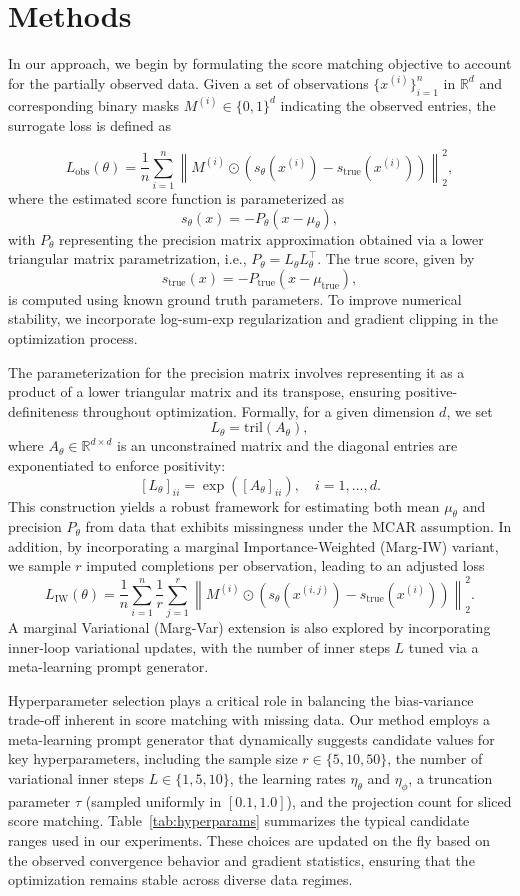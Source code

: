\documentclass{article} %
\begin{document}
\section{Methods}
In our approach, we begin by formulating the score matching objective to account for the partially observed data. Given a set of observations \( \{x^{(i)}\}_{i=1}^n \) in \( \mathbb{R}^d \) and corresponding binary masks \( M^{(i)} \in \{0,1\}^d \) indicating the observed entries, the surrogate loss is defined as

\[
L_{\mathrm{obs}}(\theta) = \frac{1}{n} \sum_{i=1}^n \left\| M^{(i)} \odot \left(s_\theta(x^{(i)}) - s_{\mathrm{true}}(x^{(i)})\right) \right\|_2^2,
\]
where the estimated score function is parameterized as 
\[
s_\theta(x) = -P_\theta (x - \mu_\theta),
\]
with \(P_\theta\) representing the precision matrix approximation obtained via a lower triangular matrix parametrization, i.e., \(P_\theta = L_\theta L_\theta^\top\). The true score, given by 
\[
s_{\mathrm{true}}(x) = -P_{\mathrm{true}} (x-\mu_{\mathrm{true}}),
\]
is computed using known ground truth parameters. To improve numerical stability, we incorporate log-sum-exp regularization and gradient clipping in the optimization process.

The parameterization for the precision matrix involves representing it as a product of a lower triangular matrix and its transpose, ensuring positive-definiteness throughout optimization. Formally, for a given dimension \(d\), we set 
\[
L_\theta = \mathrm{tril}(A_\theta),
\]
where \(A_\theta \in \mathbb{R}^{d \times d}\) is an unconstrained matrix and the diagonal entries are exponentiated to enforce positivity:
\[
[L_\theta]_{ii} = \exp\left( [A_\theta]_{ii} \right), \quad i=1,\ldots,d.
\]
This construction yields a robust framework for estimating both mean \(\mu_\theta\) and precision \(P_\theta\) from data that exhibits missingness under the MCAR assumption. In addition, by incorporating a marginal Importance-Weighted (Marg-IW) variant, we sample \(r\) imputed completions per observation, leading to an adjusted loss
\[
L_{\mathrm{IW}}(\theta) = \frac{1}{n} \sum_{i=1}^n \frac{1}{r} \sum_{j=1}^r \left\| M^{(i)} \odot \left(s_\theta(x^{(i,j)}) - s_{\mathrm{true}}(x^{(i)})\right) \right\|_2^2.
\]
A marginal Variational (Marg-Var) extension is also explored by incorporating inner-loop variational updates, with the number of inner steps \(L\) tuned via a meta-learning prompt generator.

Hyperparameter selection plays a critical role in balancing the bias-variance trade-off inherent in score matching with missing data. Our method employs a meta-learning prompt generator that dynamically suggests candidate values for key hyperparameters, including the sample size \(r \in \{5,10,50\}\), the number of variational inner steps \(L \in \{1,5,10\}\), the learning rates \(\eta_\theta\) and \(\eta_\phi\), a truncation parameter \(\tau\) (sampled uniformly in \([0.1,1.0]\)), and the projection count for sliced score matching. Table~\ref{tab:hyperparams} summarizes the typical candidate ranges used in our experiments. These choices are updated on the fly based on the observed convergence behavior and gradient statistics, ensuring that the optimization remains stable across diverse data regimes.
\end{document}
